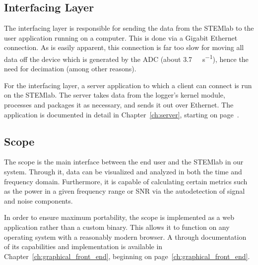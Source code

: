 \subsection{Interfacing Layer} %
\label{subsec:concept:interfacing_layer}

The interfacing layer is responsible for  sending the data from the STEMlab to
the  user application  running  on  a computer. This  is  done  via a  Gigabit
Ethernet connection. As  is easily apparent,  this connection is far  too slow
for  moving all  data off  the device  which is  generated by  the ADC  (about
\SI{3.7}{\gibi\byte\per\second}), hence  the need for decimation  (among other
reasons).

For the interfacing layer, a server  application to which a client can connect
is run on the STEMlab. The server  takes data from the logger's kernel module,
processes and packages  it as necessary, and sends it  out over Ethernet.  The
application is  documented in  detail in Chapter~\ref{ch:server},  starting on
page~\pageref{ch:server}.

%
%
\subsection{Scope} %
\label{subsec:concept:scope}

The scope is  the main interface between  the end user and the  STEMlab in our
system. Through it, data  can be visualized and analyzed in  both the time and
frequency domain.  Furthermore,  it is capable of  calculating certain metrics
such as the power  in a given frequency range or SNR  via the autodetection of
signal and noise components.

In  order  to  ensure  maximum   portability,  the  scope  is  implemented  as
a   web   application   rather   than  a   custom   binary. This   allows   it
to   function   on   any   operating   system   with   a   reasonably   modern
browser. A  through  documentation  of  its  capabilities  and  implementation
is   available    in   Chapter~\ref{ch:graphical_front_end},    beginning   on
page~\ref{ch:graphical_front_end}.



